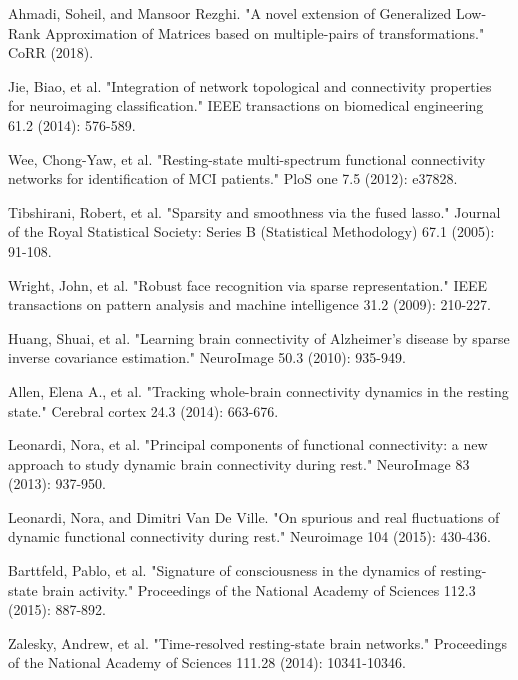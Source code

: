 \documentclass[preprint,12pt]{elsarticle}
\begin{document}
\begin{thebibliography}{1}
		Ahmadi, Soheil, and Mansoor Rezghi. "A novel extension of Generalized Low-Rank Approximation of Matrices based on multiple-pairs of transformations." CoRR (2018).
		
		
		Jie, Biao, et al. "Integration of network topological and connectivity properties for neuroimaging classification." IEEE transactions on biomedical engineering 61.2 (2014): 576-589.
		
		
	
		
		
	
		
		Wee, Chong-Yaw, et al. "Resting-state multi-spectrum functional connectivity networks for identification of MCI patients." PloS one 7.5 (2012): e37828.
		
		Tibshirani, Robert, et al. "Sparsity and smoothness via the fused lasso." Journal of the Royal Statistical Society: Series B (Statistical Methodology) 67.1 (2005): 91-108.
		
		
		
		Wright, John, et al. "Robust face recognition via sparse representation." IEEE transactions on pattern analysis and machine intelligence 31.2 (2009): 210-227.
		
		Huang, Shuai, et al. "Learning brain connectivity of Alzheimer's disease by sparse inverse covariance estimation." NeuroImage 50.3 (2010): 935-949.
		
		
		Allen, Elena A., et al. "Tracking whole-brain connectivity dynamics in the resting state." Cerebral cortex 24.3 (2014): 663-676.
		
		Leonardi, Nora, et al. "Principal components of functional connectivity: a new approach to study dynamic brain connectivity during rest." NeuroImage 83 (2013): 937-950.
		
		Leonardi, Nora, and Dimitri Van De Ville. "On spurious and real fluctuations of dynamic functional connectivity during rest." Neuroimage 104 (2015): 430-436.
		
		
		Barttfeld, Pablo, et al. "Signature of consciousness in the dynamics of resting-state brain activity." Proceedings of the National Academy of Sciences 112.3 (2015): 887-892.
		
		Zalesky, Andrew, et al. "Time-resolved resting-state brain networks." Proceedings of the National Academy of Sciences 111.28 (2014): 10341-10346.
		

\end{thebibliography}
\end{document}

